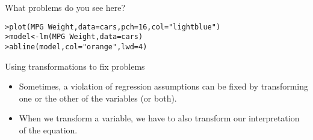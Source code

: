 \documentclass{beamer}\usepackage[]{graphicx}\usepackage[]{color}
\makeatletter
\newcommand{\hlnum}[1]{\textcolor[rgb]{0.824,0.412,0.118}{#1}}%
\newcommand{\hlstr}[1]{\textcolor[rgb]{1,0.894,0.71}{#1}}%
\newcommand{\hlopt}[1]{\textcolor[rgb]{1,0.894,0.769}{#1}}%
\newcommand{\hlstd}[1]{\textcolor[rgb]{1,0.894,0.769}{#1}}%
\newcommand{\hlkwb}[1]{\textcolor[rgb]{0.804,0.776,0.451}{#1}}%
\newcommand{\hlkwc}[1]{\textcolor[rgb]{0.78,0.941,0.545}{#1}}%
\newcommand{\hlkwd}[1]{\textcolor[rgb]{1,0.78,0.769}{#1}}%
\newenvironment{kframe}{%
 \def\at@end@of@kframe{}%
 \ifinner\ifhmode%
  \def\at@end@of@kframe{\end{minipage}}%
  \begin{minipage}{\columnwidth}%
 \fi\fi%
 \def\FrameCommand##1{\hskip\@totalleftmargin \hskip-\fboxsep
 \colorbox{shadecolor}{##1}\hskip-\fboxsep
     \hskip-\linewidth \hskip-\@totalleftmargin \hskip\columnwidth}%
 \MakeFramed {\advance\hsize-\width
   \@totalleftmargin\z@ \linewidth\hsize
   \@setminipage}}%
 {\par\unskip\endMakeFramed%
 \at@end@of@kframe}
\newenvironment{knitrout}{}{} %
\makeatother
\begin{document}
\begin{darkframes}
    \begin{frame}[fragile]{What problems do you see here?}
      \fontsm
\begin{knitrout}
\begin{kframe}
\begin{alltt}
\hlstd{> }\hlkwd{plot}\hlstd{(MPG} \hlopt{~} \hlstd{Weight,} \hlkwc{data}\hlstd{=cars,} \hlkwc{pch}\hlstd{=}\hlnum{16}\hlstd{,} \hlkwc{col}\hlstd{=}\hlstr{"lightblue"}\hlstd{)}
\hlstd{> }\hlstd{model} \hlkwb{<-} \hlkwd{lm}\hlstd{(MPG} \hlopt{~} \hlstd{Weight,} \hlkwc{data}\hlstd{=cars)}
\hlstd{> }\hlkwd{abline}\hlstd{(model,} \hlkwc{col}\hlstd{=}\hlstr{"orange"}\hlstd{,} \hlkwc{lwd}\hlstd{=}\hlnum{4}\hlstd{)}
\end{alltt}
\end{kframe}


\end{knitrout}
    \end{frame}

    \begin{frame}[fragile]{Using transformations to fix problems}
      \begin{itemize}
        \item Sometimes, a violation of regression assumptions can be fixed by transforming one or the other of the variables (or both).
        \item When we transform a variable, we have to also transform our interpretation of the equation.
      \end{itemize}
    \end{frame}

\end{darkframes}
\end{document}
